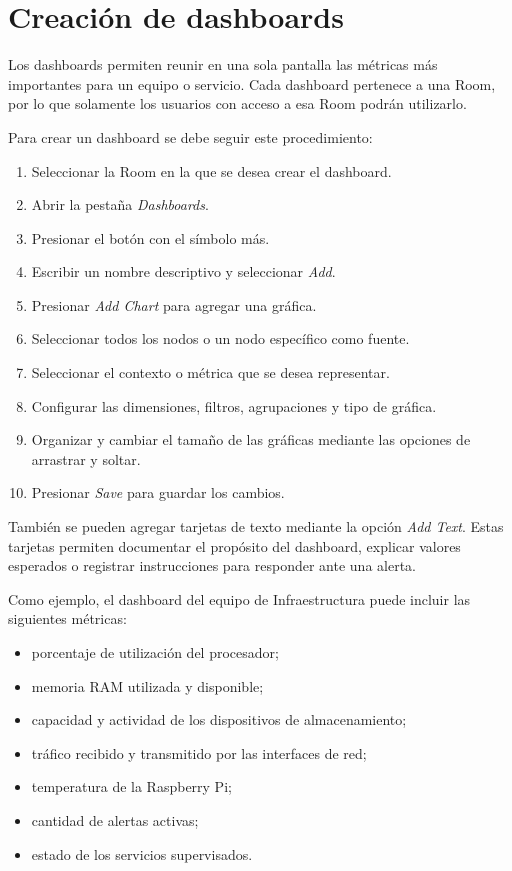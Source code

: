 \section{Creación de dashboards}

Los dashboards permiten reunir en una sola pantalla las métricas más importantes para
un equipo o servicio. Cada dashboard pertenece a una Room, por lo que solamente los
usuarios con acceso a esa Room podrán utilizarlo.

Para crear un dashboard se debe seguir este procedimiento:

\begin{enumerate}
    \item Seleccionar la Room en la que se desea crear el dashboard.
    \item Abrir la pestaña \textit{Dashboards}.
    \item Presionar el botón con el símbolo más.
    \item Escribir un nombre descriptivo y seleccionar \textit{Add}.
    \item Presionar \textit{Add Chart} para agregar una gráfica.
    \item Seleccionar todos los nodos o un nodo específico como fuente.
    \item Seleccionar el contexto o métrica que se desea representar.
    \item Configurar las dimensiones, filtros, agrupaciones y tipo de gráfica.
    \item Organizar y cambiar el tamaño de las gráficas mediante las opciones de
          arrastrar y soltar.
    \item Presionar \textit{Save} para guardar los cambios.
\end{enumerate}

También se pueden agregar tarjetas de texto mediante la opción \textit{Add Text}. Estas
tarjetas permiten documentar el propósito del dashboard, explicar valores esperados o
registrar instrucciones para responder ante una alerta.

Como ejemplo, el dashboard del equipo de Infraestructura puede incluir las siguientes
métricas:

\begin{itemize}
    \item porcentaje de utilización del procesador;
    \item memoria RAM utilizada y disponible;
    \item capacidad y actividad de los dispositivos de almacenamiento;
    \item tráfico recibido y transmitido por las interfaces de red;
    \item temperatura de la Raspberry Pi;
    \item cantidad de alertas activas;
    \item estado de los servicios supervisados.
\end{itemize}

